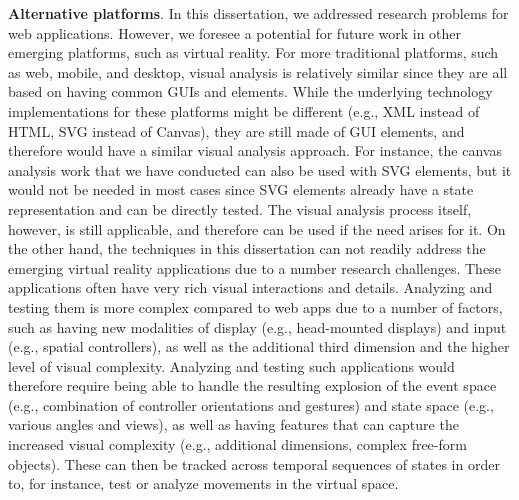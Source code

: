 {\textbf{Alternative platforms}.} 
In this dissertation, we addressed research problems for web applications. 
However, we foresee a potential for future work in other emerging platforms, 
such as virtual reality. For more traditional platforms, such as web, mobile, 
and desktop, visual analysis is relatively similar since they are all based 
on having common GUIs and elements. While the underlying technology implementations for these platforms might be different (e.g., XML instead of HTML, SVG instead of Canvas), they are still made of GUI elements, and therefore would have a similar visual analysis approach. For instance, the canvas analysis work that we have conducted can also be used with SVG elements, but it would not be needed in most cases 
since SVG elements already have a state representation and can be directly tested. 
The visual analysis process itself, however, is still applicable, and therefore can be used if the need arises for it. 
On the other hand, the techniques in this dissertation can not readily address the emerging virtual reality applications due to a number research challenges. These applications often have very rich visual interactions and details. 
Analyzing and testing them is more complex compared to web apps  
due to a number of factors, such as having new modalities of display (e.g., head-mounted displays) and input (e.g., spatial controllers), as well as the additional third dimension and the higher level of visual complexity. 
Analyzing and testing such applications would therefore require 
being able to handle the resulting explosion of the event space (e.g., combination of controller orientations and gestures) and state space (e.g., various angles and views), as well as having features that can capture the increased visual complexity (e.g., additional dimensions, complex free-form objects). These can then be 
tracked across temporal sequences of states in order to, for instance, test or analyze movements in the virtual space. 

